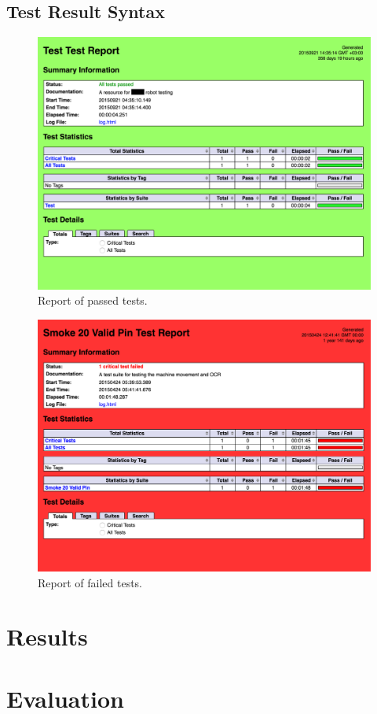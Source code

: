 \subsection{Test Result Syntax}
\label{subsection:Test result syntax}

\begin{figure}[ht]
  \begin{center}
    \includegraphics[width=.8\textwidth]{images/passed_report.png}
    \caption{Report of passed tests.}
    \label{fig:software_architecture}
  \end{center}
\end{figure}
\FloatBarrier

\begin{figure}[ht]
  \begin{center}
    \includegraphics[width=.8\textwidth]{images/failed_report.png}
    \caption{Report of failed tests.}
    \label{fig:software_architecture}
  \end{center}
\end{figure}
\FloatBarrier


\section{Results}
\label{section:Results}

\section{Evaluation}
\label{section:Evaluation}